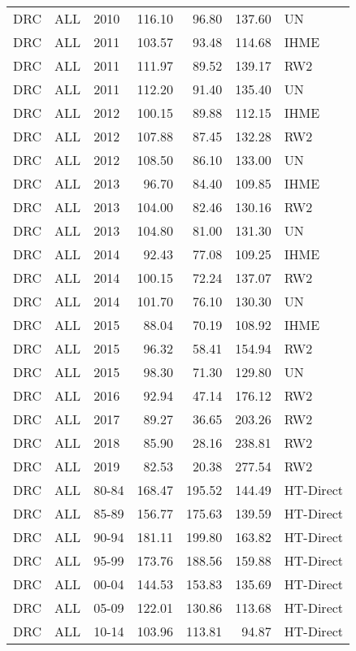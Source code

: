\begin{longtable}{lllrrrl}
  DRC & ALL & 2010 & 116.10 & 96.80 & 137.60 & UN \\ 
  DRC & ALL & 2011 & 103.57 & 93.48 & 114.68 & IHME \\ 
  DRC & ALL & 2011 & 111.97 & 89.52 & 139.17 & RW2 \\ 
  DRC & ALL & 2011 & 112.20 & 91.40 & 135.40 & UN \\ 
  DRC & ALL & 2012 & 100.15 & 89.88 & 112.15 & IHME \\ 
  DRC & ALL & 2012 & 107.88 & 87.45 & 132.28 & RW2 \\ 
  DRC & ALL & 2012 & 108.50 & 86.10 & 133.00 & UN \\ 
  DRC & ALL & 2013 & 96.70 & 84.40 & 109.85 & IHME \\ 
  DRC & ALL & 2013 & 104.00 & 82.46 & 130.16 & RW2 \\ 
  DRC & ALL & 2013 & 104.80 & 81.00 & 131.30 & UN \\ 
  DRC & ALL & 2014 & 92.43 & 77.08 & 109.25 & IHME \\ 
  DRC & ALL & 2014 & 100.15 & 72.24 & 137.07 & RW2 \\ 
  DRC & ALL & 2014 & 101.70 & 76.10 & 130.30 & UN \\ 
  DRC & ALL & 2015 & 88.04 & 70.19 & 108.92 & IHME \\ 
  DRC & ALL & 2015 & 96.32 & 58.41 & 154.94 & RW2 \\ 
  DRC & ALL & 2015 & 98.30 & 71.30 & 129.80 & UN \\ 
  DRC & ALL & 2016 & 92.94 & 47.14 & 176.12 & RW2 \\ 
  DRC & ALL & 2017 & 89.27 & 36.65 & 203.26 & RW2 \\ 
  DRC & ALL & 2018 & 85.90 & 28.16 & 238.81 & RW2 \\ 
  DRC & ALL & 2019 & 82.53 & 20.38 & 277.54 & RW2 \\ 
  DRC & ALL & 80-84 & 168.47 & 195.52 & 144.49 & HT-Direct \\ 
  DRC & ALL & 85-89 & 156.77 & 175.63 & 139.59 & HT-Direct \\ 
  DRC & ALL & 90-94 & 181.11 & 199.80 & 163.82 & HT-Direct \\ 
  DRC & ALL & 95-99 & 173.76 & 188.56 & 159.88 & HT-Direct \\ 
  DRC & ALL & 00-04 & 144.53 & 153.83 & 135.69 & HT-Direct \\ 
  DRC & ALL & 05-09 & 122.01 & 130.86 & 113.68 & HT-Direct \\ 
  DRC & ALL & 10-14 & 103.96 & 113.81 & 94.87 & HT-Direct \\ 

\end{longtable}
